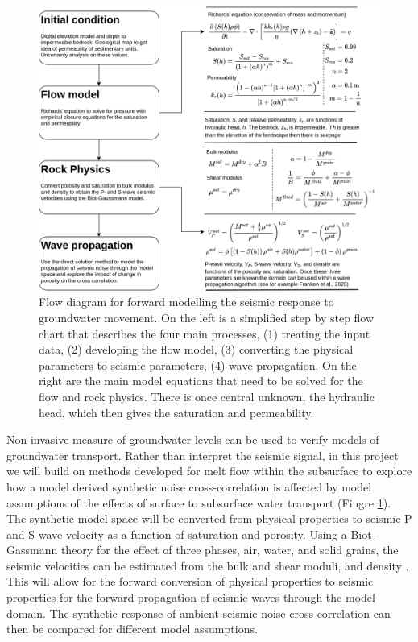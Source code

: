 \begin{figure}
    \centering
    \includegraphics[width=\textwidth]{./figures/groundwater-flowchart.png}
    \caption{Flow diagram for forward modelling the seismic response to groundwater movement. On the left is a simplified step by step flow chart that describes the four main processes, (1) treating the input data, (2) developing the flow model, (3) converting the physical parameters to seismic parameters, (4) wave propagation. On the right are the main model equations that need to be solved for the flow and rock physics. There is once central unknown, the hydraulic head, which then gives the saturation and permeability.}
    \label{fg:groundwater-flowchart}
\end{figure}

Non-invasive measure of groundwater levels can be used to verify models of groundwater transport. Rather than interpret the seismic signal, in this project we will build on methods developed for melt flow within the subsurface \citep{franken-etal-2020,armitage-etal-grl-2019} to explore how a model derived synthetic noise cross-correlation is affected by model assumptions of the effects of surface to subsurface water transport (Fiugre \ref{fg:groundwater-flowchart}). The synthetic model space will be converted from physical properties to seismic P and S-wave velocity as a function of saturation and porosity. Using a Biot-Gassmann theory for the effect of three phases, air, water, and solid grains, the seismic velocities can be estimated from the bulk and shear moduli, and density \citep[e.g.][]{rasolofasaon-2012}. This will allow for the forward conversion of physical properties to seismic properties for the forward propagation of seismic waves through the model domain. The synthetic response of ambient seismic noise cross-correlation can then be compared for different model assumptions.

